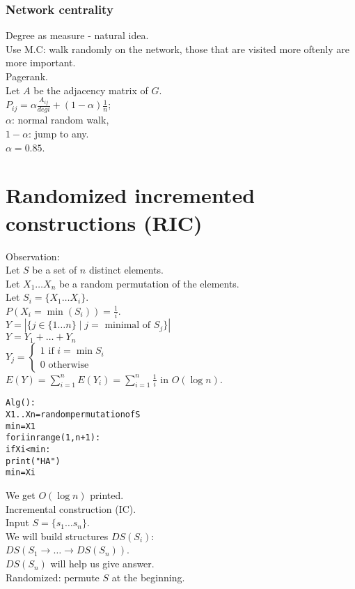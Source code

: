 \documentclass[a4paper, 12pt]{book}
\theoremstyle{definition}
\theoremstyle{remark}
\begin{document}
\subsection{Network centrality}

Degree as measure - natural idea. \\
Use M.C: walk randomly on the network, those that are visited more oftenly are more important. \\
Pagerank. \\
Let $A$ be the adjacency matrix of $G$. \\
$P_{ij} = \alpha \frac{A_{ij}}{deg i} + (1-\alpha) \frac{1}{n}$; \\
$\alpha$: normal random walk, \\
$1-\alpha$: jump to any. \\
$\alpha = 0.85$.



\chapter{Randomized incremented constructions (RIC)}


Observation: \\
Let $S$ be a set of $n$ distinct elements. \\
Let $X_1 \dots X_n$ be a random permutation of the elements. \\
Let $S_i = \{X_1 \dots X_i\}$. \\
$P(X_i = \min (S_i)) = \frac{1}{i}$. \\
$Y = \left| \{j \in \{1 \dots n\} \mid j = \text{ minimal of } S_j\} \right|$ \\
$Y = Y_1 + \dots + Y_n$ \\
$Y_j = \begin{cases}
  1 \text{ if } i = \min S_i \\
  0 \text{ otherwise}
\end{cases}$ \\
$E(Y) = \sum_{i=1}^{n} E(Y_i) = \sum_{i=1}^{n} \frac{1}{i}$ in $O(\log n)$.
\begin{alltt}
  Alg():
    X1 .. Xn = random permutation of S
    min = X1
    for i in range(1,n+1):
      if Xi < min:
        print("HA")
        min = Xi
\end{alltt}
We get $O(\log n)$  printed. \\
Incremental construction (IC). \\
Input $S = \{s_1 \dots s_n\}$. \\
We will build structures $DS(S_i)$: \\
$DS(S_1 \to \dots \to DS(S_n))$. \\
$DS(S_n)$ will help us give answer. \\
Randomized: permute $S$ at the beginning.
\end{document}
